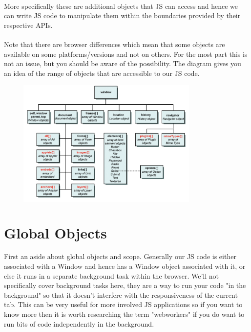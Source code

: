\paragraph{} More specifically these are additional objects that JS can access and hence we can write JS code to manipulate them within the boundaries provided by their respective APIs.
\paragraph{} Note that there are browser differences which mean that some objects are available on some platforms/versions and not on others. For the most part this is not an issue, but you should be aware of the possibility. The diagram gives you an idea of the range of objects that are accessible to our JS code.

\begin{figure}[H]
\centering
\includegraphics[width=0.8\textwidth]{figures/window-object-hierarchy}
\label{fig:window-object-hierarchy}
\caption{}
\end{figure}



\section{Global Objects}
\paragraph{} First an aside about global objects and scope. Generally our JS code is either associated with a Window and hence has a Window object associated with it, or else it runs in a separate background task within the browser. We'll not specifically cover background tasks here, they are a way to run your code "in the background" so that it doesn't interfere with the responsiveness of the current tab. This can be very useful for more involved JS applications so if you want to know more then it is worth researching the term "webworkers" if you do want to run bits of code independently in the background.
